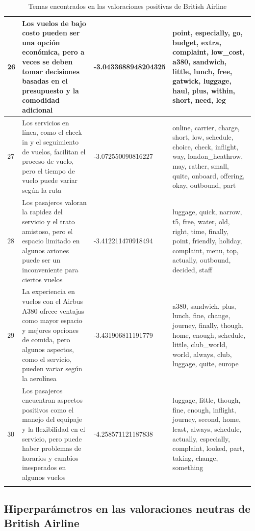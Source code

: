 \documentclass{report}
\begin{document}
{\begin{longtable}{|p{1cm}|p{4cm}|p{4cm}|p{6cm}|}
                    \hline
                    26 & Los vuelos de bajo costo pueden ser una opción económica, pero a veces se deben tomar decisiones basadas en el presupuesto y la comodidad adicional & -3.0433688948204325 & point, especially, go, budget, extra, complaint, low\_cost, a380, sandwich, little, lunch, free, gatwick, luggage, haul, plus, within, short, need, leg \\
                    \hline
                    27 & Los servicios en línea, como el check-in y el seguimiento de vuelos, facilitan el proceso de vuelo, pero el tiempo de vuelo puede variar según la ruta & -3.072550090816227 & online, carrier, charge, short, low, schedule, choice, check, inflight, way, london\_heathrow, may, rather, small, quite, onboard, offering, okay, outbound, part \\
                    \hline
                    28 & Los pasajeros valoran la rapidez del servicio y el trato amistoso, pero el espacio limitado en algunos aviones puede ser un inconveniente para ciertos vuelos & -3.412211470918494 & luggage, quick, narrow, t5, free, water, old, right, time, finally, point, friendly, holiday, complaint, menu, top, actually, outbound, decided, staff \\
                    \hline
                    29 & La experiencia en vuelos con el Airbus A380 ofrece ventajas como mayor espacio y mejores opciones de comida, pero algunos aspectos, como el servicio, pueden variar según la aerolínea & -3.431906811191779 & a380, sandwich, plus, lunch, fine, change, journey, finally, though, home, enough, schedule, little, club\_world, world, always, club, luggage, quite, europe \\
                    \hline
                    30 & Los pasajeros encuentran aspectos positivos como el manejo del equipaje y la flexibilidad en el servicio, pero puede haber problemas de horarios y cambios inesperados en algunos vuelos & -4.258571121187838 & luggage, little, though, fine, enough, inflight, journey, second, home, least, always, schedule, actually, especially, complaint, looked, part, taking, change, something \\
                    \hline
                    \caption{Temas encontrados en las valoraciones positivas de British Airline}
                \end{longtable}
            \clearpage\subsection{Hiperparámetros en las valoraciones neutras de British Airline}
}
\end{document}
